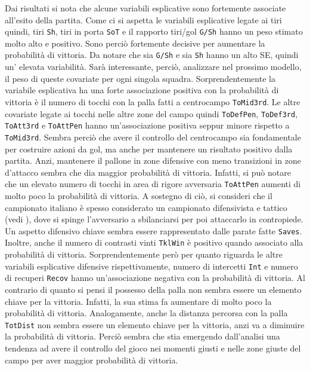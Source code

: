 Dai risultati si nota che alcune variabili esplicative sono fortemente associate all'esito della partita. Come ci si aspetta le variabili esplicative legate ai tiri quindi, tiri \texttt{Sh}, tiri in porta \texttt{SoT} e il rapporto tiri/gol \texttt{G/Sh} hanno un peso stimato molto alto e positivo. Sono perciò fortemente decisive per aumentare la probabilità di vittoria. Da notare che sia \texttt{G/Sh} e sia \texttt{Sh} hanno un alto SE, quindi un' elevata variabilità. Sarà interessante, perciò, analizzare nel prossimo modello, il peso di queste covariate per ogni singola squadra.
Sorprendentemente la variabile esplicativa ha una forte associazione positiva con la probabilità di vittoria è il numero di tocchi con la palla fatti a centrocampo \texttt{ToMid3rd}. Le altre covariate legate ai tocchi nelle altre zone del campo quindi \texttt{ToDefPen}, \texttt{ToDef3rd}, \texttt{ToAtt3rd} e \texttt{ToAttPen} hanno un'associazione positiva seppur minore rispetto a \texttt{ToMid3rd}. Sembra perciò che avere il controllo del centrocampo sia fondamentale per costruire azioni da gol, ma anche per mantenere un risultato positivo dalla partita. Anzi, mantenere il pallone in zone difensive con meno transizioni in zone d'attacco sembra che dia maggior probabilità di vittoria. Infatti, si può notare che un elevato numero di tocchi in area di rigore avversaria \texttt{ToAttPen} aumenti di molto poco la probabilità di vittoria. A sostegno di ciò, si consideri che il campionato italiano è spesso considerato un campionato difensivista e tattico (vedi \textit{\cite{speculazione}}), dove si spinge l'avversario a sbilanciarsi per poi attaccarlo in contropiede.\\
Un aspetto difensivo chiave sembra essere rappresentato dalle parate fatte \texttt{Saves}. Inoltre, anche il numero di contrasti vinti \texttt{TklWin} è positivo quando associato alla probabilità di vittoria. Sorprendentemente però per quanto riguarda le altre variabili esplicative difensive rispettivamente, numero di intercetti \texttt{Int} e numero di recuperi \texttt{Recov} hanno un'associazione negativa con la probabilità di vittoria. Al contrario di quanto si pensi il possesso della palla non sembra essere un elemento chiave per la vittoria. Infatti, la sua stima fa aumentare di molto poco la probabilità di vittoria. Analogamente, anche la distanza percorsa con la palla \texttt{TotDist} non sembra essere un elemento chiave per la vittoria, anzi va a diminuire la probabilità di vittoria. Perciò sembra che stia emergendo dall'analisi una tendenza ad avere il controllo del gioco nei momenti giusti e nelle zone giuste del campo per aver maggior probabilità di vittoria.\\
